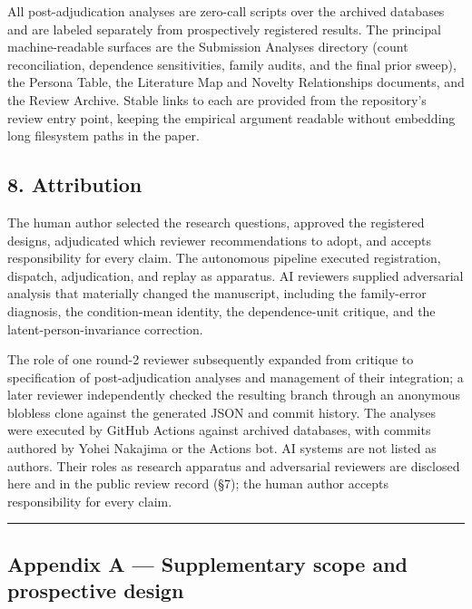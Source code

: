 \documentclass[
  11pt]{article}
\begin{document}
All post-adjudication analyses are zero-call scripts over the archived
databases and are labeled separately from prospectively registered
results. The principal machine-readable surfaces are the Submission
Analyses directory (count reconciliation, dependence sensitivities,
family audits, and the final prior sweep), the Persona Table, the
Literature Map and Novelty Relationships documents, and the Review
Archive. Stable links to each are provided from the repository's review
entry point, keeping the empirical argument readable without embedding
long filesystem paths in the paper.

\subsection{8. Attribution}\label{attribution}

The human author selected the research questions, approved the
registered designs, adjudicated which reviewer recommendations to adopt,
and accepts responsibility for every claim. The autonomous pipeline
executed registration, dispatch, adjudication, and replay as apparatus.
AI reviewers supplied adversarial analysis that materially changed the
manuscript, including the family-error diagnosis, the condition-mean
identity, the dependence-unit critique, and the latent-person-invariance
correction.

The role of one round-2 reviewer subsequently expanded from critique to
specification of post-adjudication analyses and management of their
integration; a later reviewer independently checked the resulting branch
through an anonymous blobless clone against the generated JSON and
commit history. The analyses were executed by GitHub Actions against
archived databases, with commits authored by Yohei Nakajima or the
Actions bot. AI systems are not listed as authors. Their roles as
research apparatus and adversarial reviewers are disclosed here and in
the public review record (§7); the human author accepts responsibility
for every claim.

\begin{center}\rule{0.5\linewidth}{0.5pt}\end{center}

\subsection{Appendix A --- Supplementary scope and prospective
design}\label{appendix-a-supplementary-scope-and-prospective-design}
\end{document}
